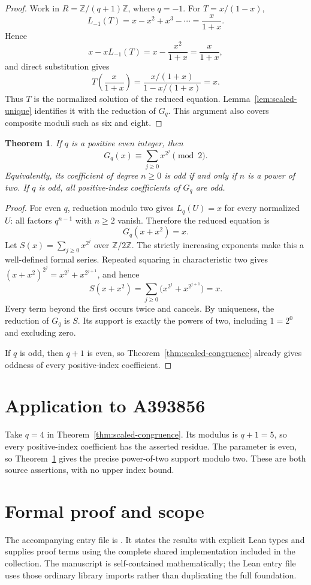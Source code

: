\documentclass[11pt,a4paper]{article}
\newtheorem{theorem}{Theorem}[section]
\theoremstyle{remark}\newtheorem{remark}[theorem]{Remark}
\newcommand{\Z}{\mathbb Z}
\begin{document}
\begin{proof}
Work in $R=\Z/(q+1)\Z$, where $q=-1$. For $T=x/(1-x)$,
\[
L_{-1}(T)=x-x^2+x^3-\cdots=\frac{x}{1+x}.
\]
Hence
\[
x-xL_{-1}(T)=x-\frac{x^2}{1+x}=\frac{x}{1+x},
\]
and direct substitution gives
\[
T\left(\frac{x}{1+x}\right)
=\frac{x/(1+x)}{1-x/(1+x)}=x.
\]
Thus $T$ is the normalized solution of the reduced equation.
Lemma~\ref{lem:scaled-unique} identifies it with the reduction of
$G_q$. This argument also covers composite moduli such as six
and eight.
\end{proof}

\begin{theorem}\label{thm:scaled-parity}
If $q$ is a positive even integer, then
\[
G_q(x)\equiv\sum_{j\ge0}x^{2^j}\pmod2.
\]
Equivalently, its coefficient of degree $n\ge0$ is odd if and only
if $n$ is a power of two. If $q$ is odd, all positive-index
coefficients of $G_q$ are odd.
\end{theorem}

\begin{proof}
For even $q$, reduction modulo two gives $L_q(U)=x$ for every
normalized $U$: all factors $q^{n-1}$ with $n\ge2$ vanish.
Therefore the reduced equation is
\[
G_q(x+x^2)=x.
\]
Let $S(x)=\sum_{j\ge0}x^{2^j}$ over $\Z/2\Z$.
The strictly increasing exponents make this a well-defined formal
series. Repeated squaring in characteristic two gives
$(x+x^2)^{2^j}=x^{2^j}+x^{2^{j+1}}$, and hence
\[
S(x+x^2)
=\sum_{j\ge0}\bigl(x^{2^j}+x^{2^{j+1}}\bigr)=x.
\]
Every term beyond the first occurs twice and cancels. By uniqueness,
the reduction of $G_q$ is $S$. Its support is exactly the powers
of two, including $1=2^0$ and excluding zero.

If $q$ is odd, then $q+1$ is even, so
Theorem~\ref{thm:scaled-congruence} already gives oddness of every
positive-index coefficient.
\end{proof}


\section{Application to A393856}
Take $q=4$ in Theorem~\ref{thm:scaled-congruence}.
Its modulus is $q+1=5$, so every positive-index
coefficient has the asserted residue. The parameter is even, so Theorem~\ref{thm:scaled-parity}
gives the precise power-of-two support modulo two. These are both
source assertions, with no upper index bound.

\section{Formal proof and scope}
The accompanying entry file is .
It states the results with explicit Lean types and supplies proof terms
using the complete shared implementation included in the collection.
The manuscript is self-contained mathematically; the Lean entry file uses
those ordinary library imports rather than duplicating the full foundation.
\end{document}
